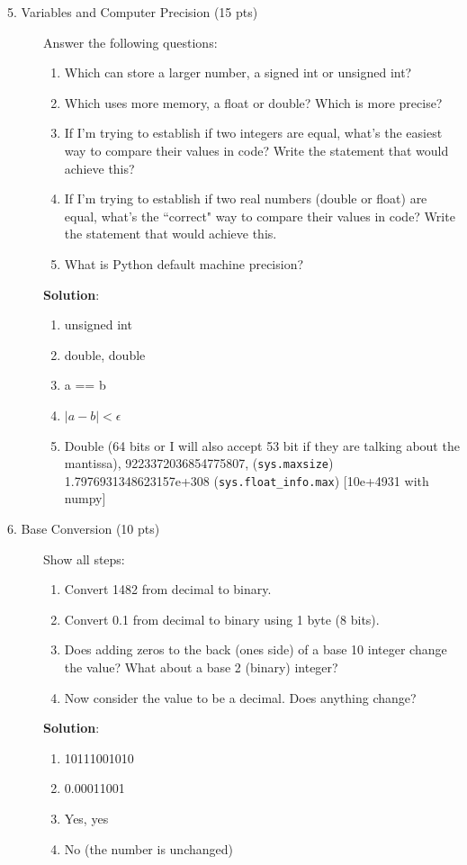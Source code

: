 \documentclass[12pt]{article}
\begin{document}
\begin{description}
\item[5. Variables and Computer Precision (15 pts)]  Answer the following questions:
	\begin{enumerate}[label=\textbf{(\alph*)}]
		\item Which can store a larger number, a signed int or unsigned int?
		\item Which uses more memory, a float or double? Which is more precise?
		\item If I'm trying to establish if two integers are equal, what's the easiest way to compare their values in code? Write the statement that would achieve this?
		\item If I'm trying to establish if two real numbers (double or float) are equal, what's the ``correct" way to compare their values in code? Write the statement that would achieve this.
		\item What is Python default machine precision?
	\end{enumerate}
	
	\color{red}
	\ifsolution
	{\bf Solution}:
    \begin{enumerate}[label=\textbf{(\alph*)}]
		\item unsigned int
		\item double, double
		\item a == b
		\item $|a - b| < \epsilon$
		\item Double (64 bits or I will also accept 53 bit if they are talking about the mantissa), 9223372036854775807, (\verb"sys.maxsize") 1.7976931348623157e+308 (\verb"sys.float_info.max") [10e+4931 with numpy]
	\end{enumerate}
	\fi
	\color{black}

\item[6. Base Conversion (10 pts)] Show all steps:
\begin{enumerate}[label=\textbf{(\alph*)}]
		\item Convert 1482 from decimal to binary.
		\item Convert 0.1 from decimal to binary using 1 byte (8 bits).
		\item Does adding zeros to the back (ones side) of a base 10 integer change the value? What about a base 2 (binary) integer?
		\item Now consider the value to be a decimal. Does anything change?
	\end{enumerate}
	
	\color{red}
	\ifsolution
	{\bf Solution}:
    \begin{enumerate}[label=\textbf{(\alph*)}]
		\item 10111001010
		\item 0.00011001
		\item Yes, yes
		\item No (the number is unchanged)
	\end{enumerate}
	\fi
	\color{black}


\end{description}
\end{document}
